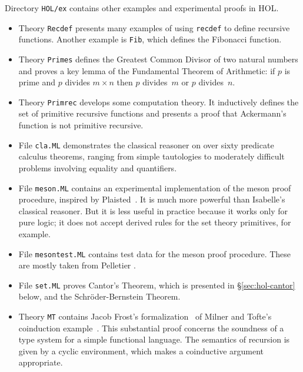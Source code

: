 Directory \texttt{HOL/ex} contains other examples and experimental proofs in
HOL.
\begin{itemize}
\item Theory \texttt{Recdef} presents many examples of using \texttt{recdef}
  to define recursive functions.  Another example is \texttt{Fib}, which
  defines the Fibonacci function.

\item Theory \texttt{Primes} defines the Greatest Common Divisor of two
  natural numbers and proves a key lemma of the Fundamental Theorem of
  Arithmetic: if $p$ is prime and $p$ divides $m\times n$ then $p$ divides~$m$
  or $p$ divides~$n$.

\item Theory \texttt{Primrec} develops some computation theory.  It
  inductively defines the set of primitive recursive functions and presents a
  proof that Ackermann's function is not primitive recursive.

\item File \texttt{cla.ML} demonstrates the classical reasoner on over sixty
  predicate calculus theorems, ranging from simple tautologies to
  moderately difficult problems involving equality and quantifiers.

\item File \texttt{meson.ML} contains an experimental implementation of the {\sc
    meson} proof procedure, inspired by Plaisted~\cite{plaisted90}.  It is
  much more powerful than Isabelle's classical reasoner.  But it is less
  useful in practice because it works only for pure logic; it does not
  accept derived rules for the set theory primitives, for example.

\item File \texttt{mesontest.ML} contains test data for the {\sc meson} proof
  procedure.  These are mostly taken from Pelletier \cite{pelletier86}.

\item File \texttt{set.ML} proves Cantor's Theorem, which is presented in
  {\S}\ref{sec:hol-cantor} below, and the Schr{\"o}der-Bernstein Theorem.

\item Theory \texttt{MT} contains Jacob Frost's formalization~\cite{frost93} of
  Milner and Tofte's coinduction example~\cite{milner-coind}.  This
  substantial proof concerns the soundness of a type system for a simple
  functional language.  The semantics of recursion is given by a cyclic
  environment, which makes a coinductive argument appropriate.
\end{itemize}


